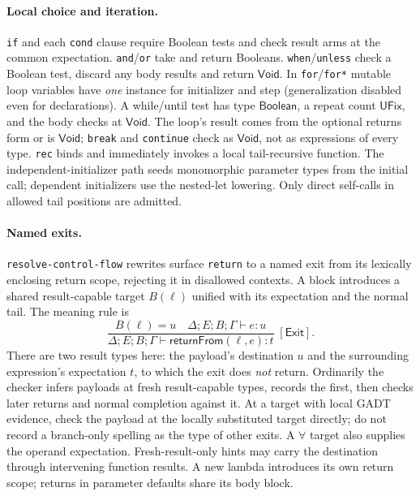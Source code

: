 \documentclass[11pt]{article}
\theoremstyle{definition}
\newcommand{\code}[1]{\texttt{#1}}
\newcommand{\src}[1]{\nolinkurl{#1}}
\newcommand{\Bool}{\mathsf{Boolean}}
\newcommand{\Void}{\mathsf{Void}}
\newcommand{\rrule}[3]{\frac{\displaystyle #2}{\displaystyle #3}
                       \;{\scriptstyle[\textsf{#1}]}}
\begin{document}
\paragraph{Local choice and iteration.}
\code{if} and each \code{cond} clause require Boolean tests and check result
arms at the common expectation. \code{and}/\code{or} take and return
Booleans. \code{when}/\code{unless} check a Boolean test, discard any body
results and return $\Void$. In \code{for}/\code{for*} mutable loop
variables have \emph{one} instance for initializer and step (generalization
disabled even for declarations). A while/until test has type $\Bool$, a
repeat count $\mathsf{UFix}$, and the body checks at $\Void$. The loop's
result comes from the optional returns form or is $\Void$; \code{break}
and \code{continue} check as $\Void$, not as expressions of every type.
\code{rec} binds and immediately invokes a local tail-recursive function.
The independent-initializer path seeds monomorphic parameter types from
the initial call; dependent initializers use the nested-let lowering.
Only direct self-calls in allowed tail positions are admitted.

\paragraph{Named exits.}
\src{resolve-control-flow} rewrites surface \code{return} to a named exit
from its lexically enclosing return scope, rejecting it in disallowed
contexts. A block introduces a shared result-capable target $B(\ell)$
unified with its expectation and the normal tail. The meaning rule is
\[
 \rrule{Exit}{B(\ell)=u \quad \Delta;E;B;\Gamma\vdash e:u}
       {\Delta;E;B;\Gamma\vdash \mathsf{returnFrom}(\ell,e):t}.
\]
There are two result types here: the payload's destination $u$ and the
surrounding expression's expectation $t$, to which the exit does \emph{not} return.
Ordinarily the checker infers payloads at fresh result-capable types,
records the first, then checks later returns and normal completion against
it. At a target with local GADT evidence, check the payload at the locally
substituted target directly; do not record a branch-only spelling as the
type of other exits. A $\forall$ target also supplies the operand
expectation. Fresh-result-only hints may carry the destination through
intervening function results. A new lambda introduces its own return
scope; returns in parameter defaults share its body block.
\end{document}
